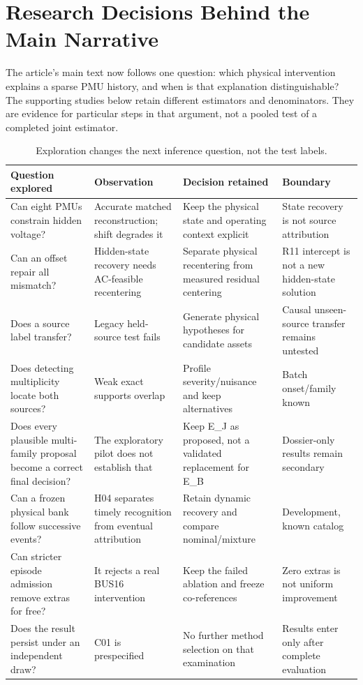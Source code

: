 \section{Research Decisions Behind the Main Narrative}
\label{app:narrative-support}

The article's main text now follows one question: which physical intervention explains a sparse PMU history, and when is that explanation distinguishable? The supporting studies below retain different estimators and denominators. They are evidence for particular steps in that argument, not a pooled test of a completed joint estimator.

\begin{table}[t]\centering\small
\caption{Exploration changes the next inference question, not the test labels.}\label{tab:supp-research-decisions}
\begin{tabularx}{\textwidth}{@{}lXXX@{}}\toprule
Question explored & Observation & Decision retained & Boundary\\\midrule
Can eight PMUs constrain hidden voltage? & Accurate matched reconstruction; shift degrades it & Keep the physical state and operating context explicit & State recovery is not source attribution\\
Can an offset repair all mismatch? & Hidden-state recovery needs AC-feasible recentering & Separate physical recentering from measured residual centering & R11 intercept is not a new hidden-state solution\\
Does a source label transfer? & Legacy held-source test fails & Generate physical hypotheses for candidate assets & Causal unseen-source transfer remains untested\\
Does detecting multiplicity locate both sources? & Weak exact supports overlap & Profile severity/nuisance and keep alternatives & Batch onset/family known\\
Does every plausible multi-family proposal become a correct final decision? & The exploratory pilot does not establish that & Keep E\_J as proposed, not a validated replacement for E\_B & Dossier-only results remain secondary\\
Can a frozen physical bank follow successive events? & H04 separates timely recognition from eventual attribution & Retain dynamic recovery and compare nominal/mixture & Development, known catalog\\
Can stricter episode admission remove extras for free? & It rejects a real BUS16 intervention & Keep the failed ablation and freeze co-references & Zero extras is not uniform improvement\\
Does the result persist under an independent draw? & C01 is prespecified & No further method selection on that examination & Results enter only after complete evaluation\\\bottomrule
\end{tabularx}\end{table}

